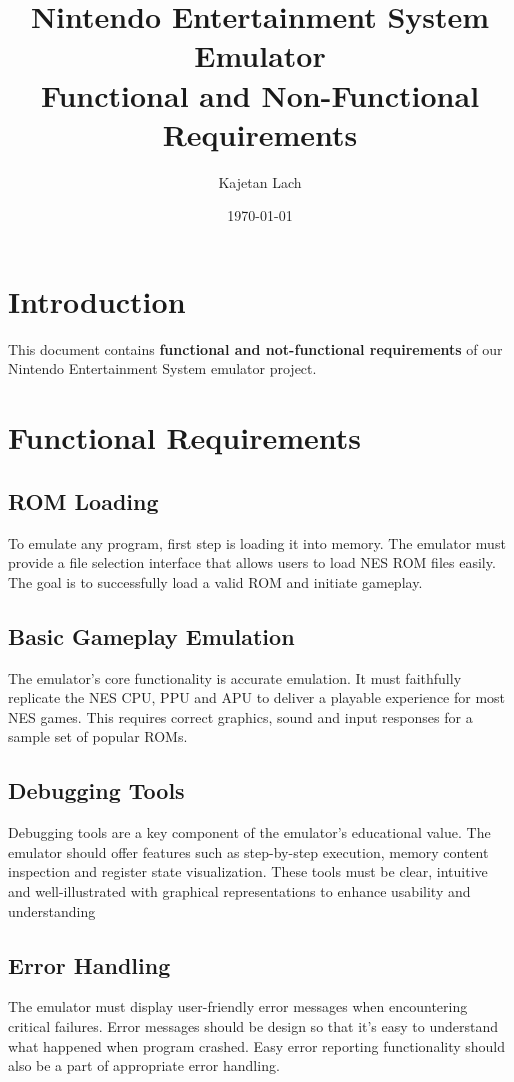 \documentclass[a4paper, 11pt]{article}
\title{%
\vspace{-2.5cm}
\textbf{Nintendo Entertainment System Emulator}\\
Functional and Non-Functional Requirements
}
\date{\today}
\author{Kajetan Lach}
\begin{document}
\maketitle

\section{Introduction}
This document contains \textbf{functional and not-functional requirements} of our Nintendo Entertainment System emulator project.

\section{Functional Requirements}

\subsection{ROM Loading}
To emulate any program, first step is loading it into memory. The emulator must provide a file selection interface that allows users to load NES ROM files easily. The goal is to successfully load a valid ROM and initiate gameplay.

\subsection{Basic Gameplay Emulation}
The emulator's core functionality is accurate emulation. It must faithfully replicate the NES CPU, PPU and APU to deliver a playable experience for most NES games. This requires correct graphics, sound and input responses for a sample set of popular ROMs.

\subsection{Debugging Tools}
Debugging tools are a key component of the emulator's educational value. The emulator should offer features such as step-by-step execution, memory content inspection and register state visualization. These tools must be clear, intuitive and well-illustrated with graphical representations to enhance usability and understanding 

\subsection{Error Handling}
The emulator must display user-friendly error messages when encountering critical failures. Error messages should be design so that it's easy to understand what happened when program crashed. Easy error reporting functionality should also be a part of appropriate error handling.
\end{document}
